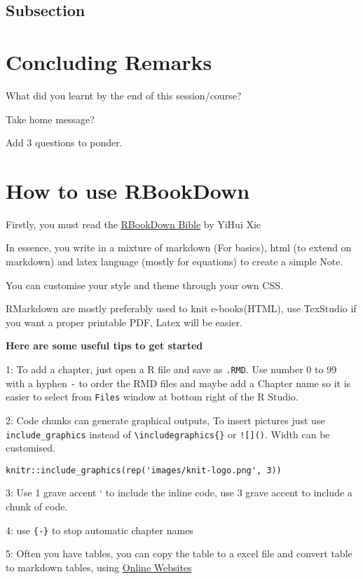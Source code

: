 \documentclass[
]{book}
\begin{document}
\hypertarget{subsection}{%
\section{Subsection}\label{subsection}}

\hypertarget{concluding-remarks}{%
\chapter*{Concluding Remarks}\label{concluding-remarks}}

What did you learnt by the end of this session/course?

Take home message?

Add 3 questions to ponder.

\hypertarget{how-to-use-rbookdown}{%
\chapter*{How to use RBookDown}\label{how-to-use-rbookdown}}

Firstly, you must read the \href{https://bookdown.org/yihui/bookdown/}{RBookDown Bible} by YiHui Xie

In essence, you write in a mixture of markdown (For basics), html (to extend on markdown) and latex language (mostly for equations) to create a simple Note.

You can customise your style and theme through your own CSS.

RMarkdown are mostly preferably used to knit e-books(HTML), use TexStudio if you want a proper printable PDF, Latex will be easier.

\textbf{Here are some useful tips to get started}

1: To add a chapter, just open a R file and save as \texttt{.RMD}. Use number 0 to 99 with a hyphen \texttt{-} to order the RMD files and maybe add a Chapter name so it is easier to select from \texttt{Files} window at bottom right of the R Studio.

2: Code chunks can generate graphical outputs, To insert pictures just use \texttt{include\_graphics} instead of \texttt{\textbackslash{}includegraphics\{\}} or \texttt{!{[}{]}()}. Width can be customised.

\begin{verbatim}
knitr::include_graphics(rep('images/knit-logo.png', 3))
\end{verbatim}

3: Use 1 grave accent ` to include the inline code, use 3 grave accent to include a chunk of code.

4: use \texttt{\{-\}} to stop automatic chapter names

5: Often you have tables, you can copy the table to a excel file and convert table to markdown tables, using \href{https://www.tablesgenerator.com/markdown_tables}{Online Websites}

  
\end{document}
